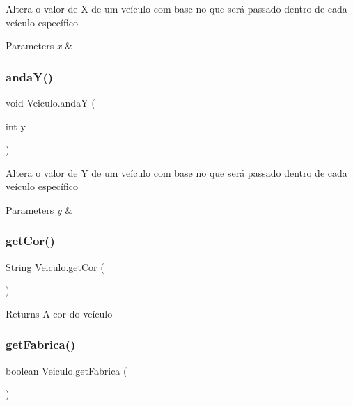 Altera o valor de X de um veículo com base no que será passado dentro de cada veículo específico


\begin{DoxyParams}{Parameters}
{\em x} & \\
\hline
\end{DoxyParams}
\mbox{\label{classVeiculo_a3e63d6cddc5c6dea8302dc1c8e9f12bc}} 
\subsubsection{\texorpdfstring{anda\+Y()}{andaY()}}
{\footnotesize\ttfamily void Veiculo.\+andaY (\begin{DoxyParamCaption}\item[{int}]{y }\end{DoxyParamCaption})\hspace{0.3cm}{\ttfamily [inline]}}

Altera o valor de Y de um veículo com base no que será passado dentro de cada veículo específico


\begin{DoxyParams}{Parameters}
{\em y} & \\
\hline
\end{DoxyParams}
\mbox{\label{classVeiculo_ad1df848daf28895b13071d6dec374480}} 
\subsubsection{\texorpdfstring{get\+Cor()}{getCor()}}
{\footnotesize\ttfamily String Veiculo.\+get\+Cor (\begin{DoxyParamCaption}{ }\end{DoxyParamCaption})\hspace{0.3cm}{\ttfamily [inline]}}

\begin{DoxyReturn}{Returns}
A cor do veículo 
\end{DoxyReturn}
\mbox{\label{classVeiculo_a6447f0eeb99399f1f96e835c22a88479}} 
\subsubsection{\texorpdfstring{get\+Fabrica()}{getFabrica()}}
{\footnotesize\ttfamily boolean Veiculo.\+get\+Fabrica (\begin{DoxyParamCaption}{ }\end{DoxyParamCaption})\hspace{0.3cm}{\ttfamily [inline]}}

